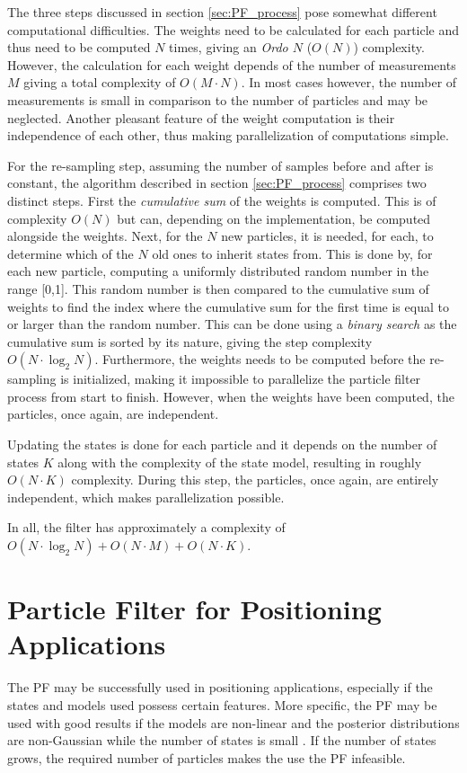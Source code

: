 \documentclass{LTHthesis}
\begin{document}
The three steps discussed in section \ref{sec:PF_process} pose somewhat different computational difficulties. The weights need to be calculated for each particle and thus need to be computed $N$ times, giving an \emph{Ordo $N$} ($O(N)$) complexity. However, the calculation for each weight depends of the number of measurements $M$ giving a total complexity of $O(M\cdot N)$. In most cases however, the number of measurements is small in comparison to the number of particles and may be neglected. Another pleasant feature of the weight computation is their independence of each other, thus making parallelization of computations simple.

For the re-sampling step, assuming the number of samples before and after is constant, the algorithm described in section \ref{sec:PF_process} comprises two distinct steps. First the \emph{cumulative sum} of the weights is computed. This is of complexity $O(N)$ but can, depending on the implementation, be computed alongside the weights. Next, for the $N$ new particles, it is needed, for each, to determine which of the $N$ old ones to inherit states from. This is done by, for each new particle, computing a uniformly distributed random number in the range [0,1]. This random number is then compared to the cumulative sum of weights to find the index where the cumulative sum for the first time is equal to or larger than the random number. This can be done using a \emph{binary search} as the cumulative sum is sorted by its nature, giving the step complexity $O(N\cdot\log_2{N})$. Furthermore, the weights needs to be computed before the re-sampling is initialized, making it impossible to parallelize the particle filter process from start to finish. However, when the weights have been computed, the particles, once again, are independent. 

Updating the states is done for each particle and it depends on the number of states $K$ along with the complexity of the state model, resulting in roughly $O(N \cdot K)$ complexity. During this step, the particles, once again, are entirely independent, which makes parallelization possible.

In all, the filter has approximately a complexity of $O(N\cdot\log_2{N}) + O(N\cdot M) + O(N\cdot K)$.
%
\section{Particle Filter for Positioning Applications}
%
The PF may be successfully used in positioning applications, especially if the states and models used possess certain features. More specific, the PF may be used with good results if the models are non-linear and the posterior distributions are non-Gaussian while the number of states is small \cite{gson12}. If the number of states grows, the required number of particles makes the use the PF infeasible.
\end{document}
